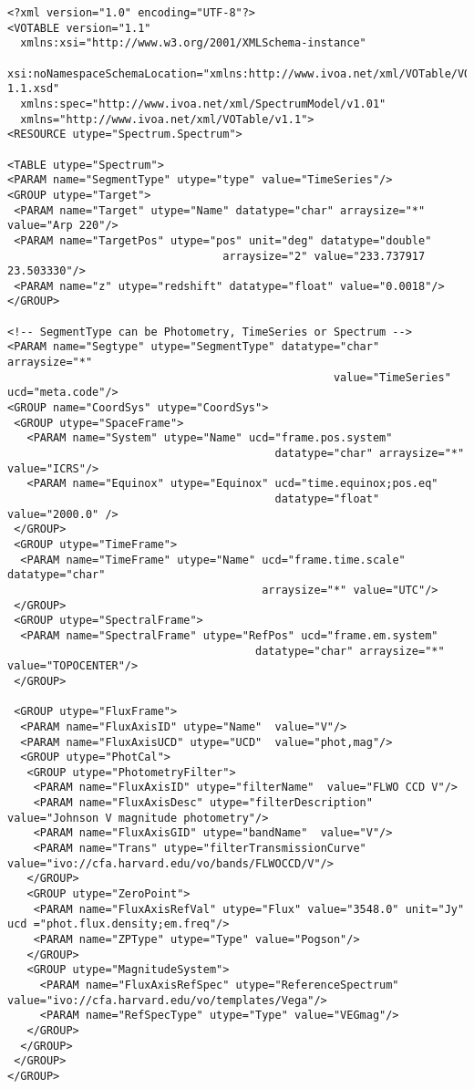 { \footnotesize
\begin{flushleft}


\begin{fmpage}

\begin{verbatim}
<?xml version="1.0" encoding="UTF-8"?>
<VOTABLE version="1.1"
  xmlns:xsi="http://www.w3.org/2001/XMLSchema-instance"
  xsi:noNamespaceSchemaLocation="xmlns:http://www.ivoa.net/xml/VOTable/VOTable-1.1.xsd" 
  xmlns:spec="http://www.ivoa.net/xml/SpectrumModel/v1.01"
  xmlns="http://www.ivoa.net/xml/VOTable/v1.1">
<RESOURCE utype="Spectrum.Spectrum">

<TABLE utype="Spectrum">   
<PARAM name="SegmentType" utype="type" value="TimeSeries"/>
<GROUP utype="Target">
 <PARAM name="Target" utype="Name" datatype="char" arraysize="*" value="Arp 220"/>
 <PARAM name="TargetPos" utype="pos" unit="deg" datatype="double" 
                                 arraysize="2" value="233.737917 23.503330"/>
 <PARAM name="z" utype="redshift" datatype="float" value="0.0018"/>
</GROUP>

<!-- SegmentType can be Photometry, TimeSeries or Spectrum -->
<PARAM name="Segtype" utype="SegmentType" datatype="char" arraysize="*" 
                                                  value="TimeSeries" ucd="meta.code"/>
<GROUP name="CoordSys" utype="CoordSys">
 <GROUP utype="SpaceFrame">
   <PARAM name="System" utype="Name" ucd="frame.pos.system" 
                                         datatype="char" arraysize="*" value="ICRS"/>
   <PARAM name="Equinox" utype="Equinox" ucd="time.equinox;pos.eq" 
                                         datatype="float" value="2000.0" />
 </GROUP>
 <GROUP utype="TimeFrame">
  <PARAM name="TimeFrame" utype="Name" ucd="frame.time.scale" datatype="char" 
                                       arraysize="*" value="UTC"/>
 </GROUP>
 <GROUP utype="SpectralFrame">
  <PARAM name="SpectralFrame" utype="RefPos" ucd="frame.em.system" 
                                      datatype="char" arraysize="*" value="TOPOCENTER"/>
 </GROUP>

 <GROUP utype="FluxFrame">
  <PARAM name="FluxAxisID" utype="Name"  value="V"/>
  <PARAM name="FluxAxisUCD" utype="UCD"  value="phot,mag"/>
  <GROUP utype="PhotCal">
   <GROUP utype="PhotometryFilter">
    <PARAM name="FluxAxisID" utype="filterName"  value="FLWO CCD V"/>
    <PARAM name="FluxAxisDesc" utype="filterDescription"  value="Johnson V magnitude photometry"/>
    <PARAM name="FluxAxisGID" utype="bandName"  value="V"/>
    <PARAM name="Trans" utype="filterTransmissionCurve" value="ivo://cfa.harvard.edu/vo/bands/FLWOCCD/V"/>
   </GROUP> 
   <GROUP utype="ZeroPoint">
    <PARAM name="FluxAxisRefVal" utype="Flux" value="3548.0" unit="Jy" ucd ="phot.flux.density;em.freq"/>
    <PARAM name="ZPType" utype="Type" value="Pogson"/>
   </GROUP>
   <GROUP utype="MagnitudeSystem">
     <PARAM name="FluxAxisRefSpec" utype="ReferenceSpectrum" value="ivo://cfa.harvard.edu/vo/templates/Vega"/>
     <PARAM name="RefSpecType" utype="Type" value="VEGmag"/>
   </GROUP>
  </GROUP>
 </GROUP>
</GROUP>


\end{verbatim}
\end{fmpage}
\end{flushleft}}
